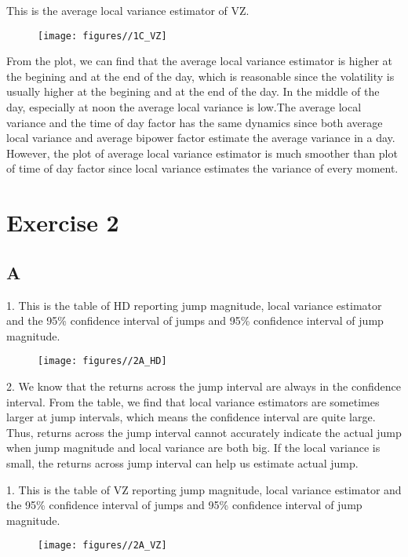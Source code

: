 \documentclass{report}
\begin{document}
This is the average local variance estimator of VZ.
\begin{figure}[H]
        \centering 
         \texttt{[image: figures//1C\_VZ]}
\end{figure}
From the plot, we can find that the average local variance estimator is higher at the begining and at the end of the day, which is reasonable since the volatility is usually higher at the begining and at the end of the day. In the middle of the day, especially at noon the average local variance is low.The average local variance and the time of day factor has the same dynamics since both average local variance and average bipower factor estimate the average variance in a day. However, the plot of average local variance estimator is much smoother than plot of time of day factor since local variance estimates the variance of every moment.


\section{ Exercise 2}

\subsection{A}
1. This is the table of HD reporting jump magnitude, local variance estimator and the 95\% confidence interval of jumps and 95\% confidence interval of jump magnitude.
\begin{figure}[H]
        \centering 
         \texttt{[image: figures//2A\_HD]}
\end{figure}

2. We know that the returns across the jump interval are always in the confidence interval. From the table, we find that local variance estimators are sometimes larger at jump intervals, which means the confidence interval are quite large. Thus, returns across the jump interval cannot accurately indicate the actual jump when jump magnitude and local variance are both big. If the local variance is small, the returns across jump interval can help us estimate actual jump.

1. This is the table of VZ reporting jump magnitude, local variance estimator and the 95\% confidence interval of jumps and 95\% confidence interval of jump magnitude.
\begin{figure}[H]
        \centering 
         \texttt{[image: figures//2A\_VZ]}
\end{figure}
\end{document}
